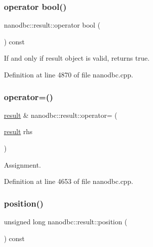 \subsubsection{\texorpdfstring{operator bool()}{operator bool()}}
{\footnotesize\ttfamily nanodbc\+::result\+::operator bool (\begin{DoxyParamCaption}{ }\end{DoxyParamCaption}) const\hspace{0.3cm}{\ttfamily [explicit]}}



If and only if result object is valid, returns true. 



Definition at line 4870 of file nanodbc.\+cpp.

\mbox{\label{classnanodbc_1_1result_a231eaf6046c90656ab52337e1549d572}} 
\subsubsection{\texorpdfstring{operator=()}{operator=()}}
{\footnotesize\ttfamily \mbox{\hyperlink{classnanodbc_1_1result}{result}} \& nanodbc\+::result\+::operator= (\begin{DoxyParamCaption}\item[{\mbox{\hyperlink{classnanodbc_1_1result}{result}}}]{rhs }\end{DoxyParamCaption})}



Assignment. 



Definition at line 4653 of file nanodbc.\+cpp.

\mbox{\label{classnanodbc_1_1result_a240f2c35df4ff9816150918a60a83f0e}} 
\subsubsection{\texorpdfstring{position()}{position()}}
{\footnotesize\ttfamily unsigned long nanodbc\+::result\+::position (\begin{DoxyParamCaption}{ }\end{DoxyParamCaption}) const}



